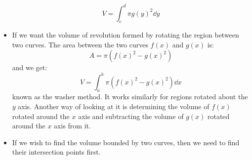 \begin{itemize}
\begin{equation}
        V=\int_c^d \pi g(y)^2 \dd{y}
        \label{eq:}
    \end{equation}
    \item If we want the volume of revolution formed by rotating the region between two curves. The area between the two curves $f(x)$ and $g(x)$ is:
    \begin{equation}
        A = \pi \left(f(x)^2-g(x)^2\right)
        \label{eq:}
    \end{equation}
    and we get:
    \begin{equation}
        V = \int_a^b \pi \left(f(x)^2-g(x)^2\right)\dd{x}
        \label{eq:}
    \end{equation}
    known as the washer method. It works similarly for regions rotated about the $y$ axis. Another way of looking at it is determining the volume of $f(x)$ rotated around the $x$ axis and subtracting the volume of $g(x)$ rotated around the $x$ axis from it.
    \item If we wish to find the volume bounded by two curves, then we need to find their intersection points first.
\end{itemize}